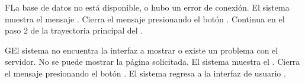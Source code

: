 
\begin{UCtrayectoriaA}{F}{La base de datos no está disponible, o hubo un error de conexión.}
    \UCpaso El sistema muestra el mensaje .
    \UCpaso[\UCactor] Cierra el mensaje presionando el botón .
    \UCpaso Continua en el paso 2 de la trayectoria principal del .
\end{UCtrayectoriaA}


\begin{UCtrayectoriaA}{G}{El sistema no encuentra la interfaz a mostrar o existe un problema con el servidor.}
    \UCpaso No se puede mostrar la página solicitada.
    \UCpaso El sistema muestra el .
    \UCpaso[\UCactor] Cierra el mensaje presionando el botón .
    \UCpaso El sistema regresa a la interfaz de usuario .
\end{UCtrayectoriaA}

